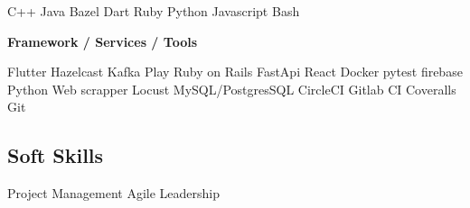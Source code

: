 \documentclass[]{Klement_Resume}
\begin{document}
\begin{minipage}[t]{0.33\textwidth}
C++ \textbullet{} Java \textbullet{} Bazel \textbullet{} Dart \textbullet{} Ruby \textbullet{} Python \textbullet{} Javascript \textbullet{} Bash

\sectionsep

{\bf Framework / Services / Tools}

Flutter \textbullet{} Hazelcast \textbullet{} Kafka \textbullet{} Play \textbullet{} Ruby on Rails \textbullet{} FastApi \textbullet{} React \textbullet{} Docker \textbullet{} pytest \textbullet{} firebase \textbullet{} Python Web scrapper \textbullet{} Locust \textbullet{} MySQL/PostgresSQL \textbullet{} CircleCI \textbullet{} Gitlab CI \textbullet{} Coveralls \textbullet{} Git


\sectionsep
\subsection{Soft Skills}
Project Management \textbullet{}  Agile \textbullet{} Leadership
\sectionsep

%
%

\end{minipage} 
\end{document}
